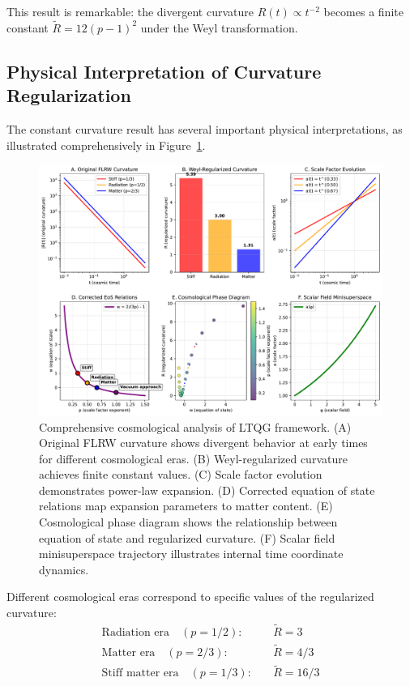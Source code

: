This result is remarkable: the divergent curvature $R(t) \propto t^{-2}$ becomes a finite constant $\tilde{R} = 12(p-1)^2$ under the Weyl transformation.

\subsection{Physical Interpretation of Curvature Regularization}
\label{subsec:physical_interpretation}

The constant curvature result has several important physical interpretations, as illustrated comprehensively in Figure~\ref{fig:cosmology_comprehensive}.

\begin{figure}[htbp]
\centering
\includegraphics[width=\textwidth]{ltqg_cosmology_comprehensive.pdf}
\caption{Comprehensive cosmological analysis of LTQG framework. (A) Original FLRW curvature shows divergent behavior at early times for different cosmological eras. (B) Weyl-regularized curvature achieves finite constant values. (C) Scale factor evolution demonstrates power-law expansion. (D) Corrected equation of state relations map expansion parameters to matter content. (E) Cosmological phase diagram shows the relationship between equation of state and regularized curvature. (F) Scalar field minisuperspace trajectory illustrates internal time coordinate dynamics.}
\label{fig:cosmology_comprehensive}
\end{figure}

\begin{theorem}
\label{thm:cosmological_eras}
Different cosmological eras correspond to specific values of the regularized curvature:
\begin{align}
\text{Radiation era} \quad (p = 1/2): \quad &\tilde{R} = 3 \\
\text{Matter era} \quad (p = 2/3): \quad &\tilde{R} = 4/3 \\
\text{Stiff matter era} \quad (p = 1/3): \quad &\tilde{R} = 16/3
\end{align}
\end{theorem}

